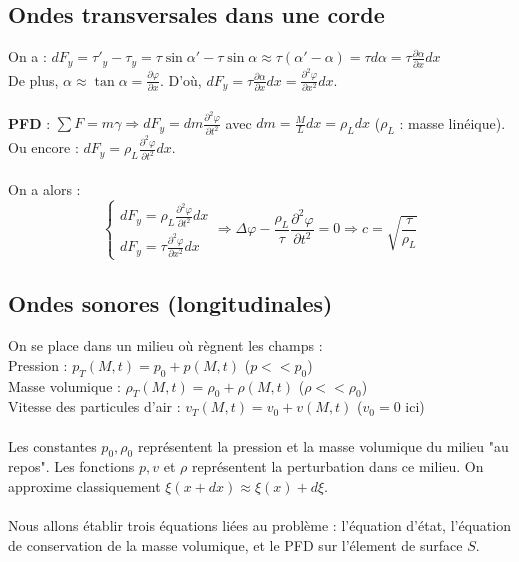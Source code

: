 \subsection{Ondes transversales dans une corde}

On a : $dF_y=\tau'_y-\tau_y=\tau\sin\alpha'-\tau\sin\alpha\approx\tau(\alpha'-\alpha)=\tau d\alpha=\tau\frac{\partial\alpha}{\partial x}dx$\\
De plus, $\alpha \approx\tan\alpha=\frac{\partial\varphi}{\partial x}$. D'où, $dF_y=\tau\frac{\partial \alpha}{\partial x}dx=\frac{\partial^2 \varphi}{\partial x^2}dx$. \\ \\
\textbf{PFD} : $\sum F=m\gamma \Rightarrow dF_y=dm \frac{\partial^2\varphi}{\partial t^2}$ avec $dm=\frac{M}{L}dx=\rho_Ldx$ ($\rho_L$ : masse linéique). Ou encore : $dF_y=\rho_L\frac{\partial^2\varphi}{\partial t^2}dx$. \\\\
On a alors :
\[
\left \{
  \begin{array}{l}
  dF_y=\rho_L\frac{\partial^2\varphi}{\partial t^2}dx \\
  dF_y=\tau\frac{\partial^2\varphi}{\partial x^2}dx 
  \end{array}
\right.
\Rightarrow \Delta\varphi - \frac{\rho_L}{\tau}\frac{\partial^2\varphi}{\partial t^2}=0
\Rightarrow c = \sqrt{\frac{\tau}{\rho_L}}
\]

\subsection{Ondes sonores (longitudinales)}

\noindent On se place dans un milieu où règnent les champs :\\
\indent Pression : $p_T(M,t)=p_0+p(M,t)$ ($p<<p_0$)\\
\indent Masse volumique : $\rho_T(M,t)=\rho_0+\rho(M,t)$ ($\rho<<\rho_0$)\\
\indent Vitesse des particules d'air : $v_T(M,t)=v_0+v(M,t)$ ($v_0=0$ ici)\\\\
Les constantes $p_0, \rho_0$ représentent la pression et la masse volumique du milieu "au repos". Les fonctions $p,v$ et $\rho$ représentent la perturbation dans ce milieu.
On approxime classiquement $\xi(x+dx)\approx\xi(x)+d\xi$.\\\\
Nous allons établir trois équations liées au problème : l'équation d'état, l'équation de conservation de la masse volumique, et le PFD sur l'élement de surface $S$.\\

